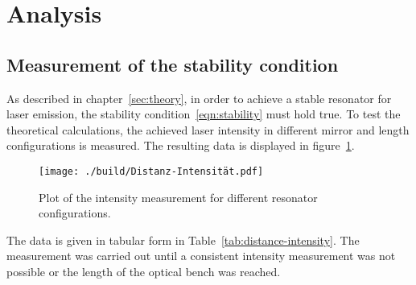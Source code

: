 \section{Analysis}
\subsection{Measurement of the stability condition}
As described in chapter~\ref{sec:theory}, in order to achieve a stable resonator
for laser emission, the stability condition~\ref{eqn:stability} must hold true.
To test the theoretical calculations, the achieved laser intensity in different
mirror and length configurations is measured. The resulting data is displayed in figure~\ref{fig:distance-intesity}.
\begin{figure}[H]
 \centering
 \texttt{[image: ./build/Distanz-Intensität.pdf]}
 \caption{Plot of the intensity measurement for different resonator configurations.}
 \label{fig:distance-intesity}
\end{figure}
\noindent
The data is given in tabular form in Table~\ref{tab:distance-intensity}.
The measurement was carried out until a consistent intensity measurement was not possible or the length of the
optical bench was reached.
